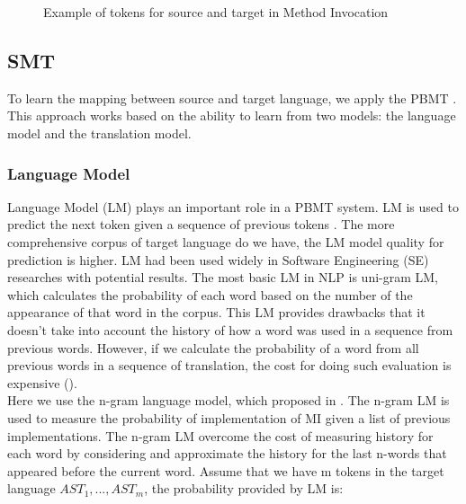 \begin{figure}[]
        \caption{\label{fig:method_desc_example} Example of tokens for source and target in Method Invocation}
      \end{figure}



\subsection{SMT}
To learn the mapping between source and target language, we apply the PBMT \cite{Green2014}. This approach works based on the ability to learn from two models: the language model and the translation model.
\subsubsection{Language Model}
Language Model (LM) plays an important role in a PBMT system. LM is used to predict the next token given a sequence of previous tokens \cite{Koehn:2003:SPT:1073445.1073462}. The more comprehensive corpus of target language do we have, the LM model quality for prediction is higher. LM had been used widely in Software Engineering (SE) researches \cite{Hindle:2012:NS:2337223.2337322,Hel:7180076,Liu:7883371} with potential results. The most basic LM in NLP is uni-gram LM, which calculates the probability of each word based on the number of the appearance of that word in the corpus. This LM provides drawbacks that it doesn't take into account the history of how a word was used in a sequence from previous words. However, if we calculate the probability of a word from all previous words in a sequence of translation, the cost for doing such evaluation is expensive (\cite{Jurafsky:2009:SLP:1214993}). 
\\
Here we use the n-gram language model, which proposed in \cite{Jurafsky:2009:SLP:1214993}. The n-gram LM is used to measure the probability of implementation of MI given a list of previous implementations. The n-gram LM overcome the cost of measuring history for each word by considering and approximate the history for the last n-words that appeared before the current word. Assume that we have m tokens in the target language \({AST_{1},...,AST_{m}}\), the probability provided by LM is:

